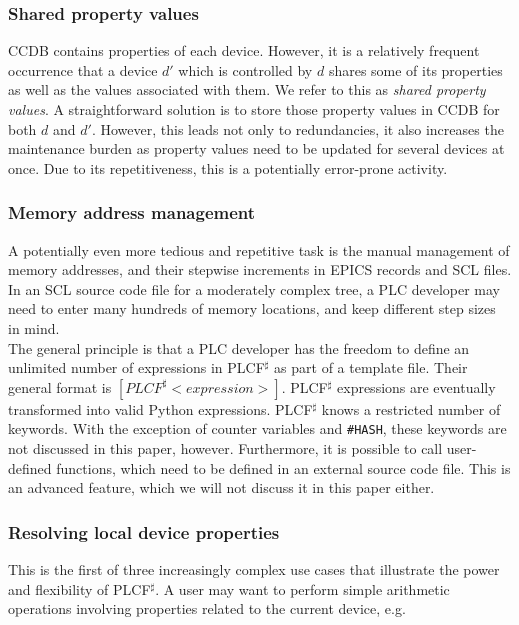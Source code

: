 \documentclass[a4paper,
              ]{jacow}
\begin{document}
\subsubsection{Shared property values}
CCDB contains properties of each device. However, it is a relatively frequent occurrence that a device $d'$ which is controlled by $d$ shares some of its properties as well as the values associated with them. We refer to this as \emph{shared property values}. A straightforward solution is to store those property values in CCDB for both $d$ and $d'$. However, this leads not only to redundancies, it also increases the maintenance burden as property values need to be updated for several devices at once. Due to its repetitiveness, this is a potentially error-prone activity.

\subsubsection{Memory address management}
A potentially even more tedious and repetitive task is the manual management of memory addresses, and their stepwise increments in EPICS records and SCL files. In an SCL source code file for a moderately complex tree, a PLC developer may need to enter many hundreds of memory locations, and keep different step sizes in mind. \\

The general principle is that a PLC developer has the freedom to define an unlimited number of expressions in PLCF$^\sharp$ as part of a template file. Their general format is $[\mathit{PLCF^\sharp} <\mathit{expression}>]$. PLCF$^\sharp$ expressions are eventually transformed into valid Python expressions. PLCF$^\sharp$ knows a  restricted number of keywords. With the exception of counter variables and \texttt{\#HASH}, these keywords are not discussed in this paper, however. Furthermore, it is possible to call user-defined functions, which need to be defined in an external source code file. This is an advanced feature, which we will not discuss it in this paper either.



\subsubsection{Resolving local device properties}
This is the first of three increasingly complex use cases that illustrate the power and flexibility of PLCF$^\sharp$. A user may want to perform simple arithmetic operations involving properties related to the current device, e.g.\ \\
\end{document}
